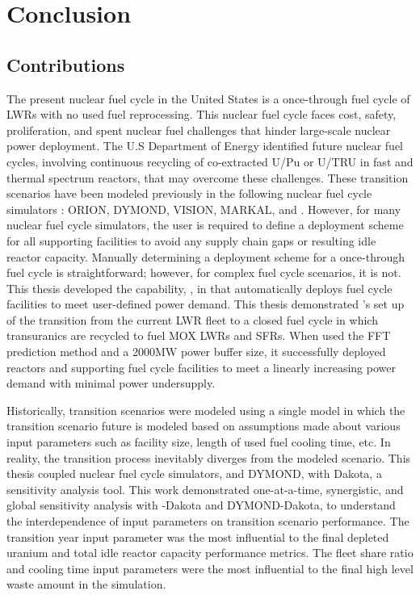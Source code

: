 \chapter{Conclusion}
\section{Contributions}
The present nuclear fuel cycle in the United States is a once-through 
fuel cycle of LWRs with no used fuel reprocessing. 
This nuclear fuel cycle faces cost, safety, proliferation, and spent 
nuclear fuel challenges that hinder large-scale nuclear power deployment. 
The U.S Department of Energy identified future 
nuclear fuel cycles, involving continuous recycling of co-extracted U/Pu or 
U/TRU in fast and thermal spectrum reactors, that may overcome these challenges.
These transition scenarios have been modeled previously in the following 
nuclear fuel cycle simulators \cite{feng_standardized_2016,bae_standardized_2019}: 
ORION, DYMOND, VISION, MARKAL, and \Cyclus. 
However, for many nuclear fuel cycle simulators, the user is required to 
define a deployment scheme for all supporting facilities to avoid any 
supply chain gaps or resulting idle reactor capacity. 
Manually determining a deployment scheme for a once-through 
fuel cycle is straightforward; however, for complex fuel cycle 
scenarios, it is not. 
This thesis developed the capability, \deploy, in \Cyclus that automatically deploys 
fuel cycle facilities to meet user-defined power demand. 
This thesis demonstrated \deploy's set up of the transition from the current 
LWR fleet to a closed fuel cycle in which transuranics are recycled to fuel 
MOX LWRs and SFRs.  
When \deploy used the FFT prediction method and a 2000MW power buffer size, 
it successfully deployed reactors and supporting fuel cycle facilities to 
meet a linearly increasing power demand with minimal power undersupply. 

Historically, transition scenarios were modeled 
using a single model in which the transition scenario future 
is modeled based on assumptions made about various input parameters 
such as facility size, length of used fuel cooling time, etc. 
In reality, the transition process inevitably diverges from the 
modeled scenario. 
This thesis coupled nuclear fuel cycle simulators, \Cyclus and 
DYMOND, with Dakota, a sensitivity analysis tool.
This work demonstrated one-at-a-time, synergistic, and 
global sensitivity analysis with \Cyclus-Dakota and DYMOND-Dakota,
to understand the interdependence of input parameters on 
transition scenario performance. 
The transition year input parameter was the most influential
to the final depleted uranium and total idle reactor capacity 
performance metrics. 
The fleet share ratio and cooling time input parameters 
were the most influential to the final high level waste amount in the 
simulation. 

